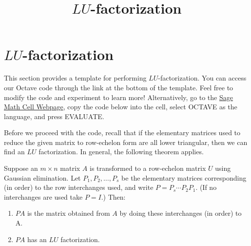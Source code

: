 \documentclass{ximera}
\title{$LU$-factorization} \license{CC BY-NC-SA 4.0}
\begin{document}
\begin{abstract}
\end{abstract}
\maketitle

\section*{$LU$-factorization}

This section provides a template for performing $LU$-factorization.  You can access our Octave code through the link at the bottom of the template.  Feel free to modify the code and experiment to learn more!  Alternatively, go to the \href{https://sagecell.sagemath.org/}{Sage Math Cell Webpage}, copy the code below into the cell, select OCTAVE as the language, and press EVALUATE. 

Before we proceed with the code, recall that if the elementary matrices used to reduce the given matrix to row-echelon form are all lower triangular, then we can find an $LU$ factorization.  In general, the following theorem applies.

\begin{theorem}[\ref{th:LUPA}]
Suppose an $m \times n$ matrix $A$ is transformed to a row-echelon matrix $U$ using Gaussian elimination. Let $P_1, P_2, \ldots, P_s$ be the elementary matrices corresponding (in order) to the row interchanges used,
and write $P=P_s \cdots P_2 P_1$. (If no interchanges are used take $P = I$.) Then:
\begin{enumerate}
\item $PA$ is the matrix obtained from $A$ by doing these interchanges (in order) to A.
\item $PA$ has an $LU$ factorization.
\end{enumerate}
\end{theorem}
\end{document}

